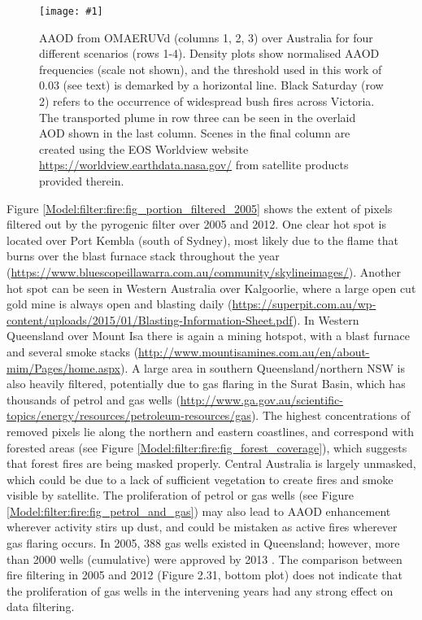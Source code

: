 \documentclass[acp, manuscript]{copernicus}
\newcommand{\parencite}{\citep}
\newcommand{\mypic}[3]{%
  \begin{figure}
    \texttt{[image: \#1]}
    \caption{#2}
    #3
  \end{figure}
}
\begin{document}
    \mypic{Figures/typical_AAODs_final.png}{%
      AAOD from OMAERUVd (columns 1, 2, 3) over Australia for four different scenarios (rows 1-4).
      Density plots show normalised AAOD frequencies (scale not shown), and the threshold used in this work of 0.03 (see text) is demarked by a horizontal line.
      Black Saturday (row 2) refers to the occurrence of widespread bush fires across Victoria. %
      The transported plume in row three can be seen in the overlaid AOD shown in the last column. %
      Scenes in the final column are created using the EOS Worldview website \url{https://worldview.earthdata.nasa.gov/} from satellite products provided therein.
    }{\label{Model:filter:fire:fig_typicalAAOD}}
    
    
    Figure \ref{Model:filter:fire:fig_portion_filtered_2005} shows the extent of pixels filtered out by the pyrogenic filter over 2005 and 2012.
    One clear hot spot is located over Port Kembla (south of Sydney), most likely due to the flame that burns over the blast furnace stack throughout the year (\url{https://www.bluescopeillawarra.com.au/community/skylineimages/}).
    Another hot spot can be seen in Western Australia over Kalgoorlie, where a large open cut gold mine is always open and blasting daily (\url{https://superpit.com.au/wp-content/uploads/2015/01/Blasting-Information-Sheet.pdf}).
    In Western Queensland over Mount Isa there is again a mining hotspot, with a blast furnace and several smoke stacks (\url{http://www.mountisamines.com.au/en/about-mim/Pages/home.aspx}).
    A large area in southern Queensland/northern NSW is also heavily filtered, potentially due to gas flaring in the Surat Basin, which has thousands of petrol and gas wells (\url{http://www.ga.gov.au/scientific-topics/energy/resources/petroleum-resources/gas}).
    The highest concentrations of removed pixels lie along the northern and eastern coastlines, and correspond with forested areas (see Figure \ref{Model:filter:fire:fig_forest_coverage}), which suggests that forest fires are being masked properly.
    Central Australia is largely unmasked, which could be due to a lack of sufficient vegetation to create fires and smoke visible by satellite.
    The proliferation of petrol or gas wells (see Figure \ref{Model:filter:fire:fig_petrol_and_gas}) may also lead to AAOD enhancement wherever activity stirs up dust, and could be mistaken as active fires wherever gas flaring occurs.
    In 2005, 388 gas wells existed in Queensland; however, more than 2000 wells (cumulative) were approved by 2013 \parencite{Carlisle2012}.
    The comparison between fire filtering in 2005 and 2012 (Figure 2.31, bottom plot) does not indicate that the proliferation of gas wells in the intervening years had any strong effect on data filtering. 
    
\end{document}
